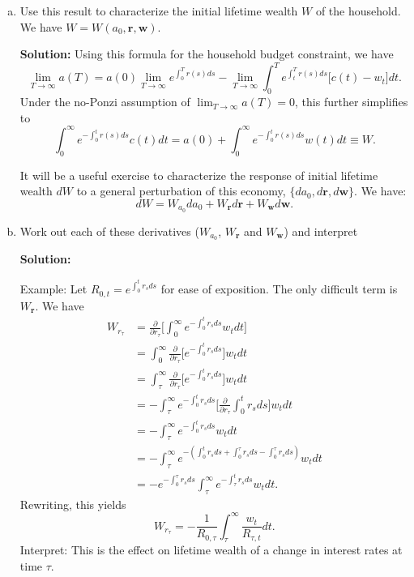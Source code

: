 \documentclass[11pt]{extarticle}
\theoremstyle{plain}
\theoremstyle{definition}
\begin{document}
\begin{enumerate}[(a)]


\item Use this result to characterize the initial lifetime wealth $W$ of the household. We have $W = W(a_0, \bm{r}, \bm{w})$. 

\textbf{Solution:} Using this formula for the household budget constraint, we have
	\begin{equation*}
		\lim_{T \to \infty} a(T)  = a(0) \lim_{T \to \infty} e^{\int_0^T r(s) ds} -  \lim_{T \to \infty} \int_0^T e^{\int_t^T r(s) ds } \Big[ c(t) - w_t \Big] dt.
	\end{equation*}
	Under the no-Ponzi assumption of $\lim_{T \to \infty} a(T) = 0$, this further simplifies to 
	\begin{equation*}
		\int_0^\infty e^{- \int_0^t r(s) ds }   c(t) dt = a(0) + \int_0^\infty e^{- \int_0^t r(s) ds }   w(t) dt \equiv W.
	\end{equation*}

\vspace{5mm}
\noindent
It will be a useful exercise to characterize the response of initial lifetime wealth $dW$ to a general perturbation of this economy, $\{da_0, d \bm r, d \bm w\}$. We have:
\begin{equation*}
	dW = W_{a_0} da_0 + W_{\bm r} d \bm{r} + W_{ \bm w} d \bm w. 
\end{equation*}

\item  Work out each of these derivatives ($ W_{a_0}$, $W_{\bm r}$ and $W_{ \bm w}$) and interpret 



\textbf{Solution:}

Example: Let $R_{0,t} = e^{\int_0^t r_s ds }$ for ease of exposition. The only difficult term is $W_{\bm r}$. We have 
\begin{align*}
	W_{r_\tau} &= \frac{\partial }{\partial r_{\tau}} \bigg[ \int_0^\infty e^{- \int_0^t r_s ds }   w_t dt \bigg] \\
	&= \int_0^\infty \frac{\partial }{\partial r_{\tau}} \bigg[e^{- \int_0^t r_s ds } \bigg] w_t dt  \\
	&= \int_\tau^\infty \frac{\partial }{\partial r_{\tau}} \bigg[e^{- \int_0^t r_s ds } \bigg] w_t dt  \\
	&= - \int_\tau^\infty e^{- \int_0^t r_s ds } \bigg[ \frac{\partial }{\partial r_{\tau}} \int_0^t r_s ds \bigg] w_t dt  \\
	&= - \int_\tau^\infty e^{- \int_0^t r_s ds } w_t dt  \\
	&= - \int_\tau^\infty e^{- (\int_0^t r_s ds + \int_0^\tau r_s ds - \int_0^\tau r_s ds)} w_t dt  \\
	&= - e^{- \int_0^\tau r_s ds } \int_\tau^\infty e^{- \int_\tau^t r_s ds} w_t dt .
\end{align*}
Rewriting, this yields 
\begin{equation*}
	W_{r_\tau} = - \frac{1}{R_{0, \tau}} \int_\tau^\infty \frac{w_t}{R_{\tau, t}} dt.
\end{equation*}
Interpret: This is the effect on lifetime wealth of a change in interest rates at time $\tau$.



\end{enumerate}
\end{document}
